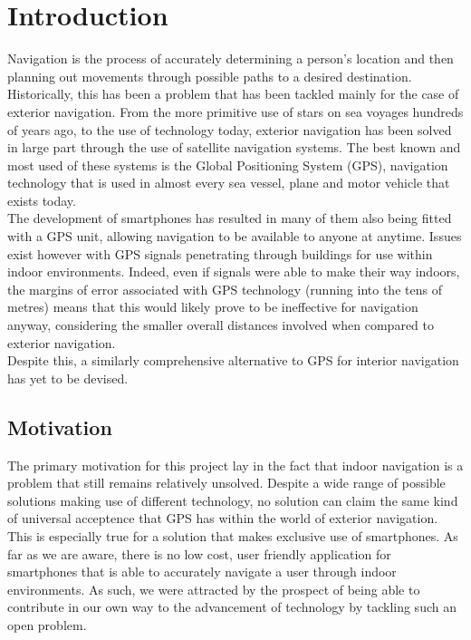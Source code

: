 \documentclass[main.tex]{subfiles}
\begin{document}
\chapter*{Introduction}

Navigation is the process of accurately determining a person's location and then planning out movements through possible paths to a desired destination. Historically, this has been a problem that has been tackled mainly for the case of exterior navigation. From the more primitive use of stars on sea voyages hundreds of years ago, to the use of technology today, exterior navigation has been solved in large part through the use of satellite navigation systems. The best known and most used of these systems is the Global Positioning System (GPS), navigation technology that is used in almost every sea vessel, plane and motor vehicle that exists today.\\

The development of smartphones has resulted in many of them also being fitted with a GPS unit, allowing navigation to be available to anyone at anytime. Issues exist however with GPS signals penetrating through buildings for use within indoor environments. Indeed, even if signals were able to make their way indoors, the margins of error associated with GPS technology (running into the tens of metres) means that this would likely prove to be ineffective for navigation anyway, considering the smaller overall distances involved when compared to exterior navigation.\\

Despite this, a similarly comprehensive alternative to GPS for interior navigation has yet to be devised.

\section*{Motivation}

The primary motivation for this project lay in the fact that indoor navigation is a problem that still remains relatively unsolved. Despite a wide range of possible solutions making use of different technology, no solution can claim the same kind of universal acceptence that GPS has within the world of exterior navigation. This is especially true for a solution that makes exclusive use of smartphones. As far as we are aware, there is no low cost, user friendly application for smartphones that is able to accurately navigate a user through indoor environments. As such, we were attracted by the prospect of being able to contribute in our own way to the advancement of technology by tackling such an open problem.\\
\end{document}
